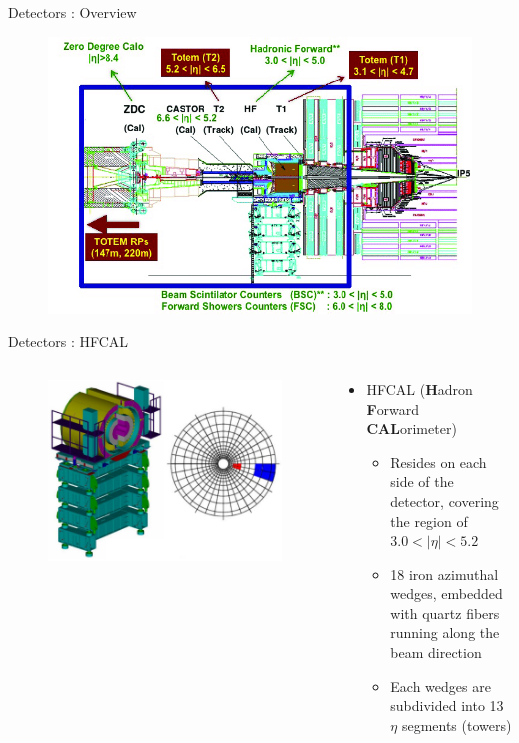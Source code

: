 \documentclass[aspectratio=169,xcolor=dvipsnames]{beamer}
\begin{document}
\begin{frame}{Detectors : Overview}
	\begin{figure}
		\centering
		\includegraphics[width=0.7\linewidth]{screenshot001}
	\end{figure}
\end{frame}


\begin{frame}{Detectors : HFCAL}
	\begin{columns}
		\begin{column}{.5\textwidth}
			\begin{figure}
				\centering
				\includegraphics[width=0.8\linewidth]{screenshot002}
			\end{figure}
		\end{column}
		\begin{column}{.5\textwidth}
			\begin{itemize}
				\item HFCAL (\textbf{H}adron \textbf{F}orward \textbf{CAL}orimeter)
				\begin{itemize}
					\item Resides on each side of the detector, covering the region of $3.0 <|\eta|<5.2$
					\item 18 iron azimuthal wedges, embedded with quartz fibers running along the beam direction
					\item Each wedges are subdivided into 13 $\eta$ segments (towers)
				\end{itemize}
			\end{itemize}
		\end{column}
	\end{columns}
\end{frame}
\end{document}
